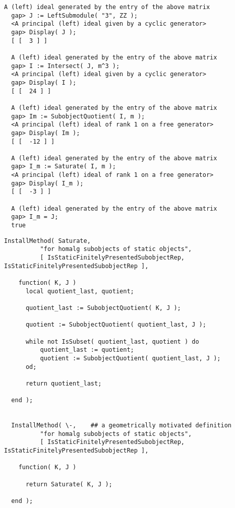 \documentclass[a4paper,11pt]{report}
\begin{document}
{{{\begin{Verbatim}[fontsize=\small,frame=single,label=Example]
  A (left) ideal generated by the entry of the above matrix
  gap> J := LeftSubmodule( "3", ZZ );
  <A principal (left) ideal given by a cyclic generator>
  gap> Display( J );
  [ [  3 ] ]
  
  A (left) ideal generated by the entry of the above matrix
  gap> I := Intersect( J, m^3 );
  <A principal (left) ideal given by a cyclic generator>
  gap> Display( I );
  [ [  24 ] ]
  
  A (left) ideal generated by the entry of the above matrix
  gap> Im := SubobjectQuotient( I, m );
  <A principal (left) ideal of rank 1 on a free generator>
  gap> Display( Im );
  [ [  -12 ] ]
  
  A (left) ideal generated by the entry of the above matrix
  gap> I_m := Saturate( I, m );
  <A principal (left) ideal of rank 1 on a free generator>
  gap> Display( I_m );
  [ [  -3 ] ]
  
  A (left) ideal generated by the entry of the above matrix
  gap> I_m = J;
  true
\end{Verbatim}
 

 
\begin{Verbatim}[fontsize=\small,frame=single,label=Code]
  InstallMethod( Saturate,
          "for homalg subobjects of static objects",
          [ IsStaticFinitelyPresentedSubobjectRep, IsStaticFinitelyPresentedSubobjectRep ],
          
    function( K, J )
      local quotient_last, quotient;
      
      quotient_last := SubobjectQuotient( K, J );
      
      quotient := SubobjectQuotient( quotient_last, J );
      
      while not IsSubset( quotient_last, quotient ) do
          quotient_last := quotient;
          quotient := SubobjectQuotient( quotient_last, J );
      od;
      
      return quotient_last;
      
  end );
  
  
  InstallMethod( \-,	## a geometrically motivated definition
          "for homalg subobjects of static objects",
          [ IsStaticFinitelyPresentedSubobjectRep, IsStaticFinitelyPresentedSubobjectRep ],
          
    function( K, J )
      
      return Saturate( K, J );
      
  end );
\end{Verbatim}
 }

 }

  }
\end{document}
